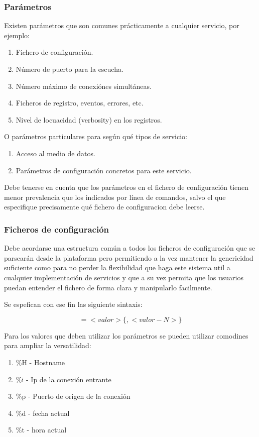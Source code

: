 \documentclass[a4paper,spanish,12pt]{book}
\begin{document}
\subsubsection{Parámetros}
Existen parámetros que son comunes prácticamente a cualquier servicio, por ejemplo:
\begin{enumerate}
	\item Fichero de configuraci\'on.
	\item N\'umero de puerto para la escucha.
	\item N\'umero m\'aximo de conexiónes simultáneas.
	\item Ficheros de registro, eventos, errores, etc.
	\item Nivel de locuacidad (verbosity) en los registros.
\end{enumerate}
O parámetros particulares para según qué tipos de servicio:
\begin{enumerate}
	\item Acceso al medio de datos.
	\item Parámetros de configuraci\'on concretos para este servicio.
\end{enumerate}
Debe tenerse en cuenta que los parámetros en el fichero de configuración tienen menor prevalencia que los indicados por línea de comandos, salvo el que especifique precisamente qué fichero de configuracion debe leerse.

\subsubsection{Ficheros de configuración}
Debe acordarse una estructura común a todos los ficheros de configuración que se parsearán desde la plataforma pero permitiendo a la vez mantener la genericidad suficiente como para no perder la flexibilidad que haga este sistema util a cualquier implementación de servicios y que a su vez permita que los usuarios puedan entender el fichero de forma clara y manipularlo facilmente.

Se espefican con ese fin las siguiente sintaxis:


\[<nombre parametro>=<valor>\{,<valor-N>\}\]


Para los valores que deben utilizar los parámetros se pueden utilizar comodines para ampliar la versatilidad:
\begin{enumerate}
	\item \%H - Hostname
	\item \%i - Ip de la conexión entrante
	\item \%p - Puerto de origen de la conexión
	\item \%d - fecha actual
	\item \%t - hora actual
\end{enumerate}
\end{document}
